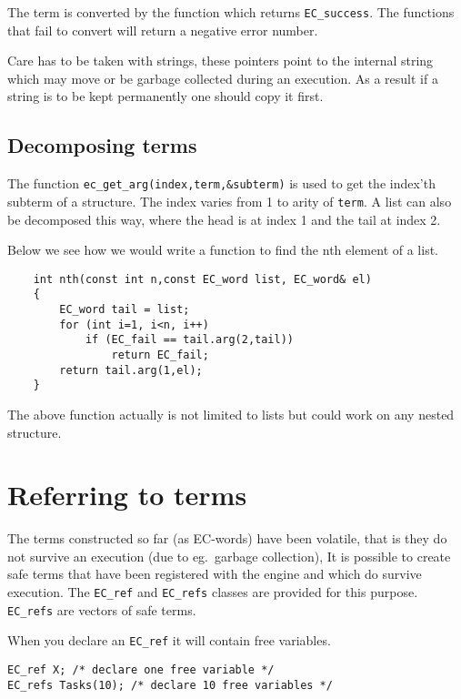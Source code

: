 The term is converted by the function which returns \verb.EC_success..
The functions that fail to convert will return a negative error number.

Care has to be taken with strings, these pointers point to the internal
{\eclipse} string which may move or be garbage collected during an {\eclipse}
execution. As a result if a string is to be kept permanently one should
copy it first.


\subsection{Decomposing {\eclipse} terms}

The function \verb.ec_get_arg(index,term,&subterm). is used to get
the index'th subterm of a structure. The index varies from 1 to
arity of \verb.term.. A list can also be decomposed this way, where
the head is at index 1 and the tail at index 2.

Below we see how we would write a function to find the nth element of
a list.
\begin{verbatim}
    int nth(const int n,const EC_word list, EC_word& el)
    {
        EC_word tail = list;
        for (int i=1, i<n, i++)
            if (EC_fail == tail.arg(2,tail))
                return EC_fail;
        return tail.arg(1,el);
    }
\end{verbatim}
The above function actually is not limited to lists but could work
on any nested structure.


\section{Referring to {\eclipse} terms}

The terms constructed so far (as EC-words) have been volatile, that is they
do not survive an {\eclipse} execution (due to eg.\ garbage collection),
It is possible to create safe terms
that have been registered with the {\eclipse} engine and which do
survive execution. The \verb.EC_ref.  and \verb.EC_refs. classes
are provided for this purpose. \verb.EC_refs. are vectors of
safe terms.

When you declare an \verb.EC_ref. it will contain free variables.
\begin{verbatim}
EC_ref X; /* declare one free variable */
EC_refs Tasks(10); /* declare 10 free variables */
\end{verbatim}


